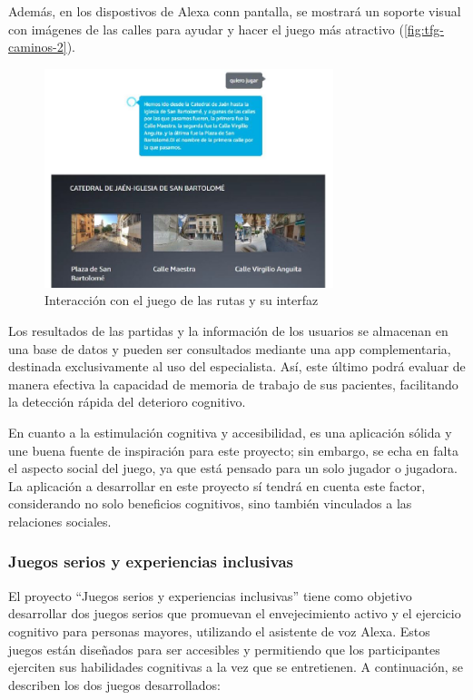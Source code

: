 Además, en los dispostivos de Alexa conn pantalla, se mostrará un soporte visual con imágenes de las calles para ayudar y hacer el juego más atractivo (\autoref{fig:tfg-caminos-2}).

\begin{figure}[H]
	\centering
	\includegraphics[width=0.75\textwidth]{imgs/tfg-caminos-2.JPG}
	\caption{Interacción con el juego de las rutas y su interfaz}
	\label{fig:tfg-caminos-2}
\end{figure}

\newpage
Los resultados de las partidas y la información de los usuarios se almacenan en una base de datos y pueden ser consultados mediante una app complementaria, destinada exclusivamente al uso del especialista. Así, este último podrá evaluar de manera efectiva la capacidad de memoria de trabajo de sus pacientes, facilitando la detección rápida del deterioro cognitivo.

En cuanto a la estimulación cognitiva y accesibilidad, es una aplicación sólida y une buena fuente de inspiración para este proyecto; sin embargo, se echa en falta el aspecto social del juego, ya que está pensado para un solo jugador o jugadora. La aplicación a desarrollar en este proyecto sí tendrá en cuenta este factor, considerando no solo beneficios cognitivos, sino también vinculados a las relaciones sociales.

\subsubsection{Juegos serios y experiencias inclusivas}

El proyecto \enquote{Juegos serios y experiencias inclusivas} \parencite{tfgAlexa4} tiene como objetivo desarrollar dos juegos serios que promuevan el envejecimiento activo y el ejercicio cognitivo para personas mayores, utilizando el asistente de voz Alexa. Estos juegos están diseñados para ser accesibles y permitiendo que los participantes ejerciten sus habilidades cognitivas a la vez que se entretienen. A continuación, se describen los dos juegos desarrollados:

